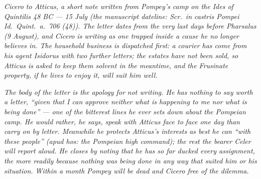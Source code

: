 
\textit{Cicero to Atticus, a short note written from Pompey's
camp on the Ides of Quintilis 48 BC --- 15 July (the manuscript
dateline: \textit{Scr.\ in castris Pompei Id.\ Quint.\ a.\ 706
(48)}). The letter dates from the very last days before
Pharsalus (9 August), and Cicero is writing as one trapped
inside a cause he no longer believes in. The household business
is dispatched first: a courier has come from his agent Isidorus
with two further letters; the estates have not been sold, so
Atticus is asked to keep them solvent in the meantime, and the
Frusinate property, if he lives to enjoy it, will suit him
well.}

\textit{The body of the letter is the apology for not writing.
He has nothing to say worth a letter, ``given that I can approve
neither what is happening to me nor what is being done'' ---
one of the bitterest lines he ever sets down about the Pompeian
camp. He would rather, he says, speak with Atticus face to face
one day than carry on by letter. Meanwhile he protects Atticus's
interests as best he can ``with these people'' (\textit{apud
hos}: the Pompeian high command); the rest the bearer Celer
will report aloud. He closes by noting that he has so far
ducked every assignment, the more readily because nothing was
being done in any way that suited him or his situation. Within
a month Pompey will be dead and Cicero free of the dilemma.}
